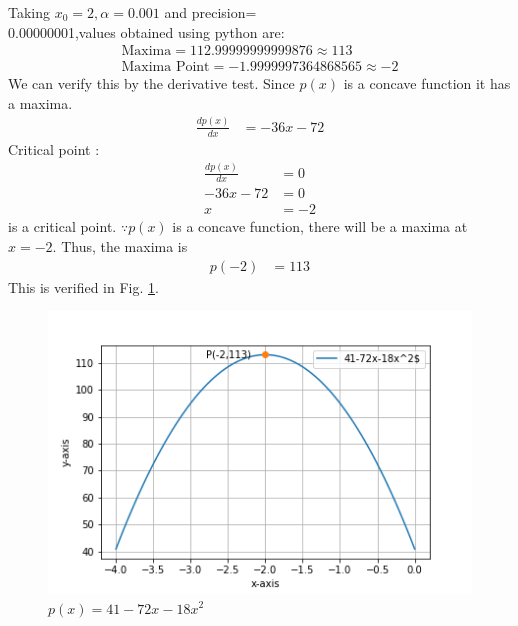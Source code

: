     Taking $x_0=2,\alpha=0.001$ and precision= \\ 0.00000001,values obtained using python are:
    \begin{align}
        \boxed{\text{Maxima} =112.99999999999876 \approx 113 }\\
        \boxed{\text{Maxima Point} =  -1.9999997364868565\approx -2}
    \end{align}
We can verify this by the derivative test.
Since $p(x)$ is a concave function it has a maxima.
\begin{align}
\frac{dp(x)}{dx}&=-36x-72
\end{align}
Critical point :
\begin{align}
 \frac{dp(x)}{dx}&=0\\
 -36x-72&=0\\
 x&=-2
\end{align} is a critical point.  $\because p(x)$ is a concave function, there will be a maxima at $x=-2$.
Thus, the maxima is
\begin{align}
p(-2)&=113
\end{align}
This is verified in  Fig. \ref{opt/2/2/p(x)}.
%
\begin{figure}[!ht]
    \centering
    \includegraphics[width=\columnwidth]{solutions/su2021/2/2/assignment14.png}
    \caption{$p(x)=41-72x-18x^2$}
    \label{opt/2/2/p(x)}	
\end{figure}


